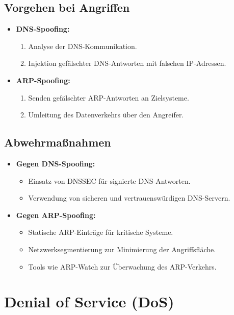\documentclass{article}
\begin{document}
\subsection{Vorgehen bei Angriffen}
\begin{itemize}
    \item \textbf{DNS-Spoofing:}
    \begin{enumerate}
        \item Analyse der DNS-Kommunikation.
        \item Injektion gefälschter DNS-Antworten mit falschen IP-Adressen.
    \end{enumerate}
    \item \textbf{ARP-Spoofing:}
    \begin{enumerate}
        \item Senden gefälschter ARP-Antworten an Zielsysteme.
        \item Umleitung des Datenverkehrs über den Angreifer.
    \end{enumerate}
\end{itemize}

\subsection{Abwehrmaßnahmen}
\begin{itemize}
    \item \textbf{Gegen DNS-Spoofing:}
    \begin{itemize}
        \item Einsatz von DNSSEC für signierte DNS-Antworten.
        \item Verwendung von sicheren und vertrauenswürdigen DNS-Servern.
    \end{itemize}
    \item \textbf{Gegen ARP-Spoofing:}
    \begin{itemize}
        \item Statische ARP-Einträge für kritische Systeme.
        \item Netzwerksegmentierung zur Minimierung der Angriffsfläche.
        \item Tools wie ARP-Watch zur Überwachung des ARP-Verkehrs.
    \end{itemize}
\end{itemize}



\section{Denial of Service (DoS)}
\end{document}
